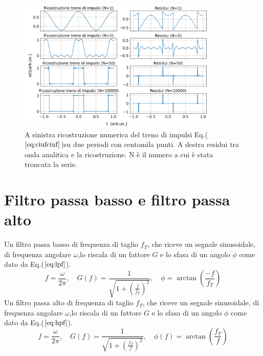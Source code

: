 \documentclass{article}
\begin{document}
    \begin{figure}[H]
        \centering
        \includegraphics[width=0.85\textwidth]{foupulsetrainwave1e5.png} %
        \caption{A sinistra ricostruzione numerica del treno di impulsi
        Eq.($\ref{eq:ciufciuf}$)su due periodi con centomila punti.
        A destra residui tra onda analitica e la ricostruzione.
        N è il numero a cui è stata troncata la serie. }
        \label{fig:ciufciuf2}
    \end{figure}



\section{Filtro passa basso e filtro passa alto}
    \label{sez:filt}
    Un filtro passa basso di frequenza di taglio $f_T$, che riceve un segnale sinusoidale, di 
    frequenza angolare $\omega$,lo riscala di un fattore $G$ e lo sfasa di un 
    angolo $\phi$ come dato da Eq.($\ref{eq:lpf}$).
        \begin{equation}
            f = \frac{\omega}{2\pi}, \quad 
            G(f) = \frac{1}{\sqrt{1 + \left(\frac{f}{f_T}\right)^2}}, \quad 
            \phi = \arctan\left(\frac{-f}{f_T}\right)
            \label{eq:lpf}
        \end{equation}
    Un filtro passa alto di frequenza di taglio $f_T$, che riceve un segnale sinusoidale, di 
    frequenza angolare $\omega$,lo riscala di un fattore $G$ e lo sfasa di un 
    angolo $\phi$ come dato da Eq.($\ref{eq:hpf}$).
        \begin{equation}
            f = \frac{\omega}{2\pi}, \quad 
            G(f) = \frac{1}{\sqrt{1 + \left(\frac{f_T}{f}\right)^2}}, \quad 
            \phi(f)= \arctan\left(\frac{f_T}{f}\right)
            \label{eq:hpf}
        \end{equation}
\end{document}
